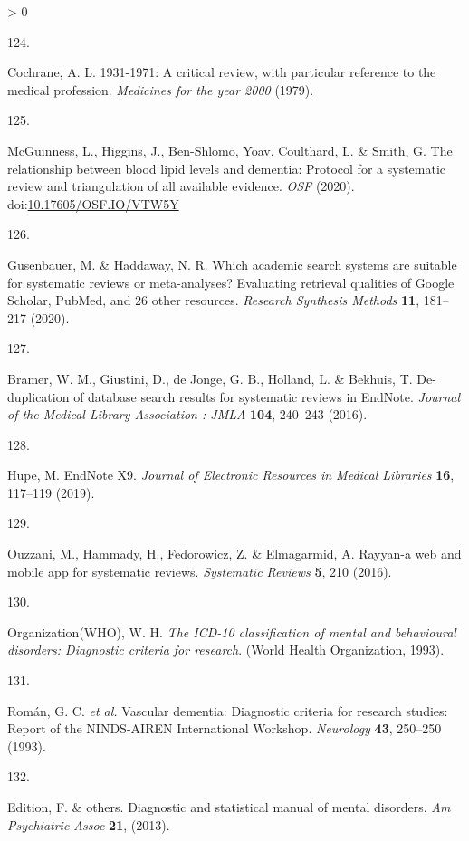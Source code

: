 \documentclass[a4paper, twoside]{templates/ociamthesis}
\newlength{\cslhangindent}
\newlength{\csllabelwidth}
\newenvironment{CSLReferences}[3] %
 {%
  \setlength{\parindent}{0pt}
  \ifodd #1 \everypar{\setlength{\hangindent}{\cslhangindent}}\ignorespaces\fi
  \ifnum #2 > 0
  \setlength{\parskip}{#2\baselineskip}
  \fi
 }%
 {}
\newcommand{\CSLLeftMargin}[1]{\parbox[t]{\maxof{\widthof{#1}}{\csllabelwidth}}{#1}}
\newcommand{\CSLRightInline}[1]{\parbox[t]{\linewidth - \csllabelwidth}{#1}}
\begin{document}
\begin{CSLReferences}{0}{0}
\leavevmode\hypertarget{ref-cochrane1979}{}%
\CSLLeftMargin{124. }
\CSLRightInline{Cochrane, A. L. 1931-1971: A critical review, with particular reference to the medical profession. \emph{Medicines for the year 2000} (1979).}

\leavevmode\hypertarget{ref-mcguinnessluke2020}{}%
\CSLLeftMargin{125. }
\CSLRightInline{McGuinness, L., Higgins, J., Ben-Shlomo, Yoav, Coulthard, L. \& Smith, G. The relationship between blood lipid levels and dementia: Protocol for a systematic review and triangulation of all available evidence. \emph{OSF} (2020). doi:\href{https://doi.org/10.17605/OSF.IO/VTW5Y}{10.17605/OSF.IO/VTW5Y}}

\leavevmode\hypertarget{ref-gusenbauer2020a}{}%
\CSLLeftMargin{126. }
\CSLRightInline{Gusenbauer, M. \& Haddaway, N. R. Which academic search systems are suitable for systematic reviews or meta-analyses? {Evaluating} retrieval qualities of {Google Scholar}, {PubMed}, and 26 other resources. \emph{Research Synthesis Methods} \textbf{11}, 181--217 (2020).}

\leavevmode\hypertarget{ref-bramer2016}{}%
\CSLLeftMargin{127. }
\CSLRightInline{Bramer, W. M., Giustini, D., de Jonge, G. B., Holland, L. \& Bekhuis, T. De-duplication of database search results for systematic reviews in {EndNote}. \emph{Journal of the Medical Library Association : JMLA} \textbf{104}, 240--243 (2016).}

\leavevmode\hypertarget{ref-hupe2019}{}%
\CSLLeftMargin{128. }
\CSLRightInline{Hupe, M. {EndNote X9}. \emph{Journal of Electronic Resources in Medical Libraries} \textbf{16}, 117--119 (2019).}

\leavevmode\hypertarget{ref-ouzzani2016}{}%
\CSLLeftMargin{129. }
\CSLRightInline{Ouzzani, M., Hammady, H., Fedorowicz, Z. \& Elmagarmid, A. Rayyan-a web and mobile app for systematic reviews. \emph{Systematic Reviews} \textbf{5}, 210 (2016).}

\leavevmode\hypertarget{ref-organizationwho1993}{}%
\CSLLeftMargin{130. }
\CSLRightInline{Organization(WHO), W. H. \emph{The {ICD}-10 classification of mental and behavioural disorders: {Diagnostic} criteria for research}. ({World Health Organization}, 1993).}

\leavevmode\hypertarget{ref-roman1993}{}%
\CSLLeftMargin{131. }
\CSLRightInline{Román, G. C. \emph{et al.} Vascular dementia: Diagnostic criteria for research studies: Report of the {NINDS}-{AIREN International Workshop}. \emph{Neurology} \textbf{43}, 250--250 (1993).}

\leavevmode\hypertarget{ref-edition2013}{}%
\CSLLeftMargin{132. }
\CSLRightInline{Edition, F. \& others. Diagnostic and statistical manual of mental disorders. \emph{Am Psychiatric Assoc} \textbf{21}, (2013).}


\end{CSLReferences}
\end{document}
